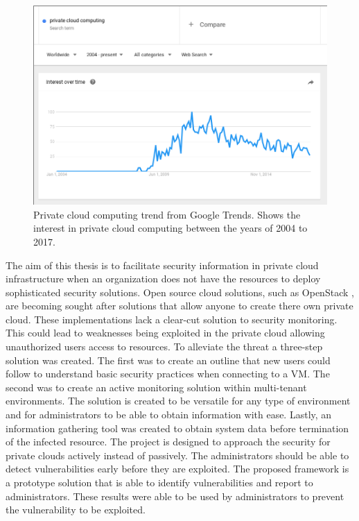 \documentclass[12pt]{article}
\begin{document}
\begin{figure}[ht]
    \centering
    \includegraphics[scale=.3]{./pic/2017-06-14-135222_914x619_scrot.png}
    \caption{Private cloud computing trend from Google Trends. Shows the interest in private cloud computing between the years of 2004 to 2017. \cite{GoogleTrendsPriv}}
    \label{fig:PrivCloudTrendGoogle}
\end{figure}
\fi

The aim of this thesis is to facilitate security information in private cloud infrastructure when an organization does not have the resources to deploy sophisticated security solutions. Open source cloud solutions, such as OpenStack \cite{Openstack}, are becoming sought after solutions that allow anyone to create there own private cloud. These implementations lack a clear-cut solution to security monitoring. This could lead to weaknesses being exploited in the private cloud allowing unauthorized users access to resources. To alleviate the threat a three-step solution was created. The first was to create an outline that new users could follow to understand basic security practices when connecting to a VM. The second was to create an active monitoring solution within multi-tenant environments. The solution is created to be versatile for any type of environment and for administrators to be able to obtain information with ease. Lastly, an information gathering tool was created to obtain system data before termination of the infected resource. The project is designed to approach the security for private clouds actively instead of passively. The administrators should be able to detect vulnerabilities early before they are exploited. The proposed framework is a prototype solution that is able to identify vulnerabilities and report to administrators. These results were able to be used by administrators to prevent the vulnerability to be exploited.
\end{document}
